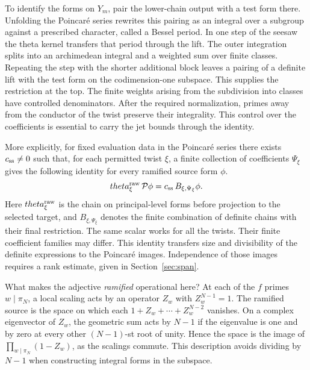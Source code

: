 \documentclass[11pt,letterpaper]{article}
\begin{document}
To identify the forms on \(Y_m\), pair the lower-chain output with a test form there. Unfolding the Poincar\'e series rewrites this pairing as an integral over a subgroup against a prescribed character, called a Bessel period. In one step of the seesaw the theta kernel transfers that period through the lift. The outer integration splits into an archimedean integral and a weighted sum over finite classes. Repeating the step with the shorter additional block leaves a pairing of a definite lift with the test form on the codimension-one subspace. This supplies the restriction at the top. The finite weights arising from the subdivision into classes have controlled denominators. After the required normalization, primes away from the conductor of the twist preserve their integrality. This control over the coefficients is essential to carry the jet bounds through the identity.

More explicitly, for fixed evaluation data in the Poincar\'e series there exists \(c_{\rm ss}\ne0\) such that, for each permitted twist \(\xi\), a finite collection of coefficients \(\Psi_\xi\) gives the following identity for every ramified source form \(\phi\).
\[
  \Theta_{\xi}^{\rm raw}\,\mathcal P\phi
       =c_{\rm ss}\,B_{\xi,\Psi_\xi}\phi.
\]
Here \(\Theta_{\xi}^{\rm raw}\) is the chain on principal-level forms before projection to the selected target, and \(B_{\xi,\Psi_\xi}\) denotes the finite combination of definite chains with their final restriction. The same scalar works for all the twists. Their finite coefficient families may differ. This identity transfers size and divisibility of the definite expressions to the Poincar\'e images. Independence of those images requires a rank estimate, given in Section~\ref{sec:span}.

What makes the adjective \emph{ramified} operational here? At each of the \(f\) primes \(w\mid\pi_N\), a local scaling acts by an operator \(Z_w\) with \(Z_w^{N-1}=1\). The ramified source is the space on which each \(1+Z_w+\cdots+Z_w^{N-2}\) vanishes. On a complex eigenvector of \(Z_w\), the geometric sum acts by \(N-1\) if the eigenvalue is one and by zero at every other \((N-1)\)-st root of unity. Hence the space is the image of \(\prod_{w\mid\pi_N}(1-Z_w)\), as the scalings commute. This description avoids dividing by \(N-1\) when constructing integral forms in the subspace.
\end{document}
